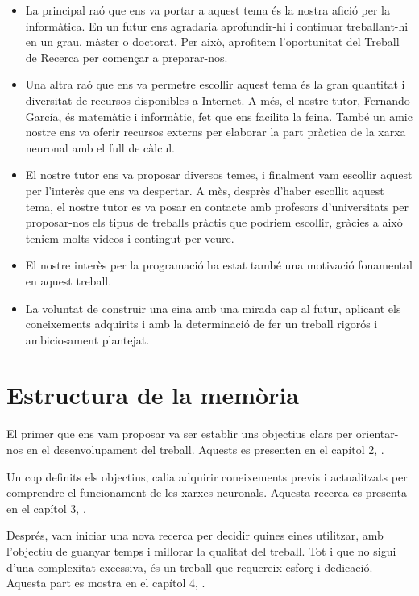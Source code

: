 \begin{itemize}
 \item La principal raó que ens va portar a aquest tema és la nostra afició per la informàtica. En un futur ens agradaria aprofundir-hi i continuar treballant-hi en un grau, màster o doctorat. Per això, aprofitem l’oportunitat del Treball de Recerca per començar a preparar-nos.

 \item Una altra raó que ens va permetre escollir aquest tema és la gran quantitat i diversitat de recursos disponibles a Internet. A més, el nostre tutor, Fernando García, és matemàtic i informàtic, fet que ens facilita la feina. També un amic nostre ens va oferir recursos externs per elaborar la part pràctica de la xarxa neuronal amb el full de càlcul.

 \item El nostre tutor ens va proposar diversos temes, i finalment vam escollir aquest per l’interès que ens va despertar.
 A mès, desprès d'haber escollit aquest tema, el nostre tutor es va posar en contacte amb profesors d'universitats per proposar-nos els tipus de treballs pràctis que podriem escollir, gràcies a això teniem molts videos i contingut per veure.

 \item El nostre interès per la programació ha estat també una motivació fonamental en aquest treball.

 \item La voluntat de construir una eina amb una mirada cap al futur, aplicant els coneixements adquirits i amb la determinació de fer un treball rigorós i ambiciosament plantejat.
\end{itemize}

\section{Estructura de la memòria}
El primer que ens vam proposar va ser establir uns objectius clars per orientar-nos en el desenvolupament del treball. Aquests es presenten en el capítol 2, .

Un cop definits els objectius, calia adquirir coneixements previs i actualitzats per comprendre el funcionament de les xarxes neuronals. Aquesta recerca es presenta en el capítol 3, .

Després, vam iniciar una nova recerca per decidir quines eines utilitzar, amb l’objectiu de guanyar temps i millorar la qualitat del treball. Tot i que no sigui d’una complexitat excessiva, és un treball que requereix esforç i dedicació. Aquesta part es mostra en el capítol 4, .

